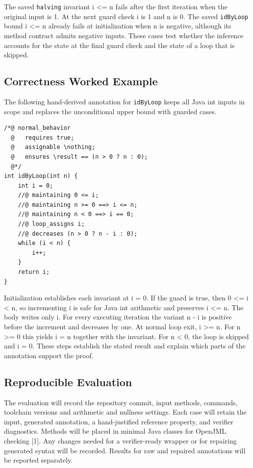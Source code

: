 \documentclass[11pt,a4paper]{article}
\begin{document}
The saved \texttt{halving} invariant i \textless{}= n fails after the first iteration when the original input is 1. At the next guard check i is 1 and n is 0. The saved \texttt{idByLoop} bound i \textless{}= n already fails at initialization when n is negative, although its method contract admits negative inputs. These cases test whether the inference accounts for the state at the final guard check and the state of a loop that is skipped.

\subsection{Correctness Worked Example}
The following hand-derived annotation for \texttt{idByLoop} keeps all Java int inputs in scope and replaces the unconditional upper bound with guarded cases.

\begin{samepage}
\small
\begin{verbatim}
/*@ normal_behavior
  @   requires true;
  @   assignable \nothing;
  @   ensures \result == (n > 0 ? n : 0);
  @*/
int idByLoop(int n) {
    int i = 0;
    //@ maintaining 0 <= i;
    //@ maintaining n >= 0 ==> i <= n;
    //@ maintaining n < 0 ==> i == 0;
    //@ loop_assigns i;
    //@ decreases (n > 0 ? n - i : 0);
    while (i < n) {
        i++;
    }
    return i;
}
\end{verbatim}
\end{samepage}
Initialization establishes each invariant at i = 0. If the guard is true, then 0 \textless{}= i \textless{} n, so incrementing i is safe for Java int arithmetic and preserves i \textless{}= n. The body writes only i. For every executing iteration the variant n - i is positive before the increment and decreases by one. At normal loop exit, i \textgreater{}= n. For n \textgreater{}= 0 this yields i = n together with the invariant. For n \textless{} 0, the loop is skipped and i = 0. These steps establish the stated result and explain which parts of the annotation support the proof.

\subsection{Reproducible Evaluation}
The evaluation will record the repository commit, input methods, commands, toolchain versions and arithmetic and nullness settings. Each case will retain the input, generated annotation, a hand-justified reference property, and verifier diagnostics. Methods will be placed in minimal Java classes for OpenJML checking [1]. Any changes needed for a verifier-ready wrapper or for repairing generated syntax will be recorded. Results for raw and repaired annotations will be reported separately.
\end{document}
